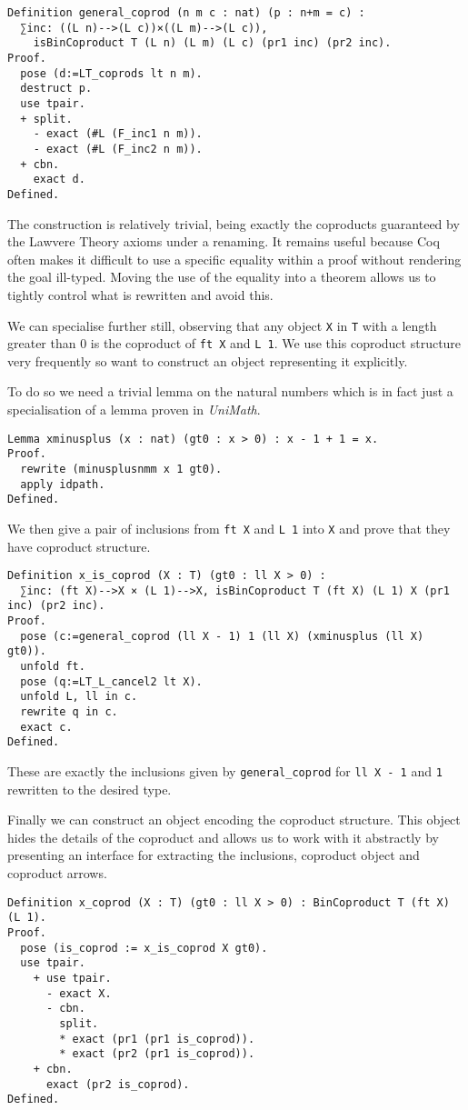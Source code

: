 \begin{lstlisting}
Definition general_coprod (n m c : nat) (p : n+m = c) : 
  ∑inc: ((L n)-->(L c))×((L m)-->(L c)),
    isBinCoproduct T (L n) (L m) (L c) (pr1 inc) (pr2 inc).
Proof.
  pose (d:=LT_coprods lt n m).
  destruct p.
  use tpair.
  + split.
    - exact (#L (F_inc1 n m)).
    - exact (#L (F_inc2 n m)).
  + cbn.
    exact d.
Defined.
\end{lstlisting}

The construction is relatively trivial, being exactly the coproducts guaranteed
by the Lawvere Theory axioms under a renaming. It remains useful because Coq
often makes it difficult to use a specific equality within a proof without
rendering the goal ill-typed. Moving the use of the equality into a theorem
allows us to tightly control what is rewritten and avoid this.

We can specialise further still, observing that any object \lstinline|X| in \lstinline|T|
with a length greater than 0 is the coproduct of \lstinline|ft X| and \lstinline|L 1|. We
use this coproduct structure very frequently so want to construct an object
representing it explicitly.

To do so we need a trivial lemma on the natural numbers which is in fact just a
specialisation of a lemma proven in \textit{UniMath}.

\begin{lstlisting}
Lemma xminusplus (x : nat) (gt0 : x > 0) : x - 1 + 1 = x.
Proof.
  rewrite (minusplusnmm x 1 gt0).
  apply idpath.
Defined.
\end{lstlisting}

We then give a pair of inclusions from \lstinline|ft X| and \lstinline|L 1| into \lstinline|X|
and prove that they have coproduct structure. 
\begin{lstlisting}
Definition x_is_coprod (X : T) (gt0 : ll X > 0) : 
  ∑inc: (ft X)-->X × (L 1)-->X, isBinCoproduct T (ft X) (L 1) X (pr1 inc) (pr2 inc).
Proof.
  pose (c:=general_coprod (ll X - 1) 1 (ll X) (xminusplus (ll X) gt0)).
  unfold ft.
  pose (q:=LT_L_cancel2 lt X).
  unfold L, ll in c.
  rewrite q in c.
  exact c.
Defined.
\end{lstlisting}

These are exactly the inclusions given by \lstinline|general_coprod| for 
\lstinline|ll X - 1| and \lstinline|1| rewritten to the desired type.

Finally we can construct an object encoding the coproduct structure. This object
hides the details of the coproduct and allows us to work with it abstractly by
presenting an interface for extracting the inclusions, coproduct object and
coproduct arrows.
\begin{lstlisting}
Definition x_coprod (X : T) (gt0 : ll X > 0) : BinCoproduct T (ft X) (L 1).
Proof.
  pose (is_coprod := x_is_coprod X gt0).
  use tpair.
    + use tpair.
      - exact X.
      - cbn.
        split.
        * exact (pr1 (pr1 is_coprod)).
        * exact (pr2 (pr1 is_coprod)).
    + cbn.
      exact (pr2 is_coprod).
Defined.
\end{lstlisting}

